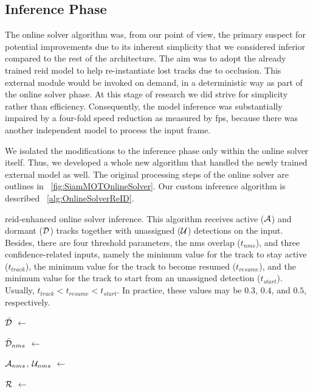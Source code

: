 \subsection{Inference Phase}

The online solver algorithm was, from our point of view, the primary suspect for potential improvements due to its inherent simplicity that we considered inferior compared to the rest of the architecture. The aim was to adopt the already trained \gls{reid} model to help re-instantiate lost tracks due to occlusion. This external module would be invoked on demand, in a deterministic way as part of the online solver phase. At this stage of research we did strive for simplicity rather than efficiency. Consequently, the model inference was substantially impaired by a four-fold speed reduction as measured by \gls{fps}, because there was another independent model to process the input frame.

We isolated the modifications to the inference phase only within the online solver itself. Thus, we developed a whole new algorithm that handled the newly trained external model as well. The original processing steps of the online solver are outlines in \figtext{}~\ref{fig:SiamMOTOnlineSolver}. Our custom inference algorithm is described \algtext{}~\ref{alg:OnlineSolverReID}.

\begin{algorithm}[t]
    \caption[\Gls{reid}-enhanced online solver inference]{\Gls{reid}-enhanced online solver inference. This algorithm receives active ($\mathcal{A}$) and dormant ($\mathcal{D}$) tracks together with unassigned ($\mathcal{U}$) detections on the input. Besides, there are four threshold parameters, the \gls{nms} overlap ($t_{nms}$), and three confidence-related inputs, namely the minimum value for the track to stay active ($t_{track}$), the minimum value for the track to become resumed ($t_{resume}$), and the minimum value for the track to start from an unassigned detection ($t_{start}$). Usually, $t_{track} < t_{resume} < t_{start}$. In practice, these values may be $0.3$, $0.4$, and $0.5$, respectively.}
    \label{alg:OnlineSolverReID}
    \begin{algorithmic}[1]

        \State $\mathcal{\bar{D}}$ $\gets$ 

        \State $\mathcal{\bar{D}}_{nms}$ $\gets$ 

        \State $\mathcal{A}_{nms}$, $\mathcal{U}_{nms}$ $\gets$ 

        \State $\mathcal{R}$ $\gets$ 
        \EndFunction
    \end{algorithmic}
\end{algorithm}

